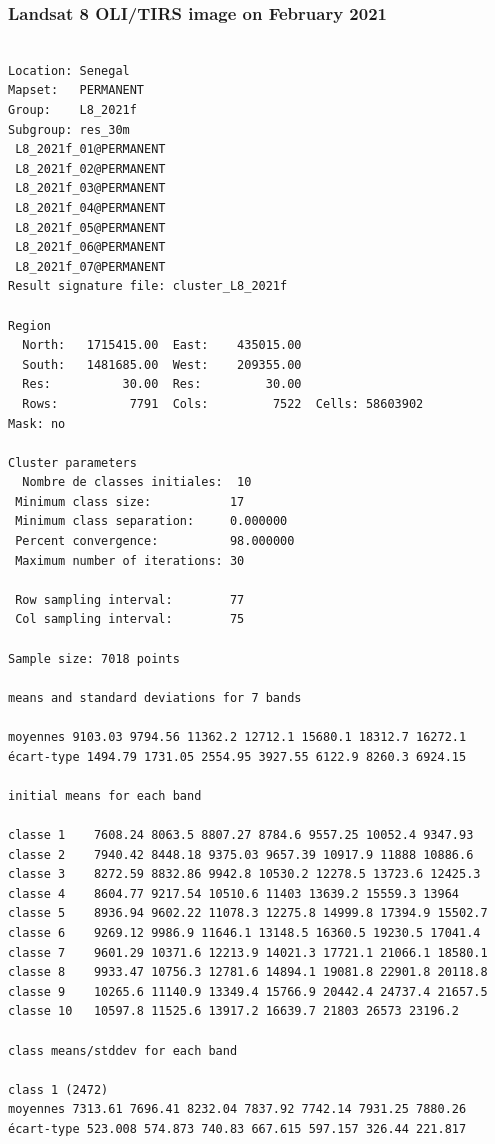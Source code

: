 \documentclass[earth,article,submit,pdftex,moreauthors]{Definitions/mdpi}
\begin{document}
\subsubsection[\appendixname~\thesubsubsection]{Landsat 8 OLI/TIRS image on February 2021}
\begin{scriptsize}
\begin{verbatim}

Location: Senegal
Mapset:   PERMANENT
Group:    L8_2021f
Subgroup: res_30m
 L8_2021f_01@PERMANENT
 L8_2021f_02@PERMANENT
 L8_2021f_03@PERMANENT
 L8_2021f_04@PERMANENT
 L8_2021f_05@PERMANENT
 L8_2021f_06@PERMANENT
 L8_2021f_07@PERMANENT
Result signature file: cluster_L8_2021f

Region
  North:   1715415.00  East:    435015.00
  South:   1481685.00  West:    209355.00
  Res:          30.00  Res:         30.00
  Rows:          7791  Cols:         7522  Cells: 58603902
Mask: no

Cluster parameters
  Nombre de classes initiales: 	10
 Minimum class size:           17
 Minimum class separation:     0.000000
 Percent convergence:          98.000000
 Maximum number of iterations: 30

 Row sampling interval:        77
 Col sampling interval:        75

Sample size: 7018 points

means and standard deviations for 7 bands

moyennes 9103.03 9794.56 11362.2 12712.1 15680.1 18312.7 16272.1
écart-type 1494.79 1731.05 2554.95 3927.55 6122.9 8260.3 6924.15

initial means for each band

classe 1    7608.24 8063.5 8807.27 8784.6 9557.25 10052.4 9347.93
classe 2    7940.42 8448.18 9375.03 9657.39 10917.9 11888 10886.6
classe 3    8272.59 8832.86 9942.8 10530.2 12278.5 13723.6 12425.3
classe 4    8604.77 9217.54 10510.6 11403 13639.2 15559.3 13964
classe 5    8936.94 9602.22 11078.3 12275.8 14999.8 17394.9 15502.7
classe 6    9269.12 9986.9 11646.1 13148.5 16360.5 19230.5 17041.4
classe 7    9601.29 10371.6 12213.9 14021.3 17721.1 21066.1 18580.1
classe 8    9933.47 10756.3 12781.6 14894.1 19081.8 22901.8 20118.8
classe 9    10265.6 11140.9 13349.4 15766.9 20442.4 24737.4 21657.5
classe 10   10597.8 11525.6 13917.2 16639.7 21803 26573 23196.2

class means/stddev for each band

class 1 (2472)
moyennes 7313.61 7696.41 8232.04 7837.92 7742.14 7931.25 7880.26
écart-type 523.008 574.873 740.83 667.615 597.157 326.44 221.817


\end{verbatim}
\end{scriptsize}
\end{document}
